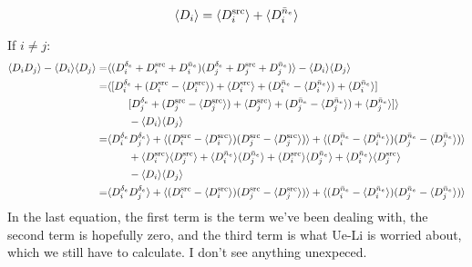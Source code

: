 \documentclass[onecolumn,prd,noshowpacs,nofootinbib,amsmath,amssymb]{revtex4}
\begin{document}
\begin{equation}
\langle D_i \rangle =  \langle D^{\rm src}_i \rangle
    + \langle D^{\bar{n}_e}_i \rangle
\end{equation}

If $i \neq j$:
\begin{align}
\langle D_i D_j \rangle - \langle D_i \rangle \langle D_j \rangle
    =& \langle (D^{\delta_e}_i + D^{\rm src}_i +  D^{\bar{n}_e}_i)
              (D^{\delta_e}_j + D^{\rm src}_j +  D^{\bar{n}_e}_j) \rangle
              - \langle D_i \rangle \langle D_j \rangle
    \\
    =& \langle [
        D^{\delta_e}_i
        + (D^{\rm src}_i - \langle D^{\rm src}_i \rangle)
        + \langle D^{\rm src}_i \rangle
        +  (D^{\bar{n}_e}_i -  \langle D^{\bar{n}_e}_i \rangle)
        + \langle D^{\bar{n}_e}_i \rangle
    ]
    \nonumber \\
    & \qquad [
        D^{\delta_e}_j
       + (D^{\rm src}_j - \langle D^{\rm src}_j \rangle)
        + \langle D^{\rm src}_j \rangle
        +  (D^{\bar{n}_e}_j -  \langle D^{\bar{n}_e}_j \rangle)
        + \langle D^{\bar{n}_e}_j \rangle
    ] \rangle
    \nonumber \\
    & \qquad - \langle D_i \rangle \langle D_j \rangle
    \\
    =& \langle D^{\delta_e}_i D^{\delta_e}_j \rangle
        + \langle (D^{\rm src}_i - \langle D^{\rm src}_i \rangle)
                 (D^{\rm src}_j - \langle D^{\rm src}_j \rangle) \rangle
        + \langle (D^{\bar{n}_e}_i -  \langle D^{\bar{n}_e}_i \rangle)
                  (D^{\bar{n}_e}_j -  \langle D^{\bar{n}_e}_j \rangle) \rangle
    \nonumber \\
    & \qquad
        + \langle D^{\rm src}_i \rangle \langle D^{\rm src}_j \rangle
        + \langle D^{\bar{n}_e}_i \rangle \langle D^{\bar{n}_e}_j \rangle
        + \langle D^{\rm src}_i \rangle \langle D^{\bar{n}_e}_j \rangle
        + \langle D^{\bar{n}_e}_i \rangle \langle D^{\rm src}_j \rangle
    \nonumber \\
    & \qquad - \langle D_i \rangle \langle D_j \rangle
    \\
    =& \langle D^{\delta_e}_i D^{\delta_e}_j \rangle
        + \langle (D^{\rm src}_i - \langle D^{\rm src}_i \rangle)
                 (D^{\rm src}_j - \langle D^{\rm src}_j \rangle) \rangle
        + \langle (D^{\bar{n}_e}_i -  \langle D^{\bar{n}_e}_i \rangle)
                  (D^{\bar{n}_e}_j -  \langle D^{\bar{n}_e}_j \rangle) \rangle
\end{align}
In the last equation, the first term is the term we've been dealing with, the
second term is hopefully zero, and the third term is what Ue-Li is worried
about, which we still have to calculate. I don't see anything unexpeced.
\end{document}
